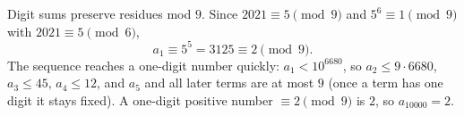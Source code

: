 Digit sums preserve residues mod $9$. Since $2021\equiv5\pmod9$ and $5^6\equiv1\pmod9$ with $2021\equiv5\pmod6$,
\[a_1\equiv5^5=3125\equiv2\pmod9.\]
The sequence reaches a one-digit number quickly: $a_1<10^{6680}$, so $a_2\le9\cdot6680$, $a_3\le45$, $a_4\le12$, and $a_5$ and all later terms are at most $9$ (once a term has one digit it stays fixed). A one-digit positive number $\equiv2\pmod9$ is $2$, so $a_{10000}=\boxed{2}$.
